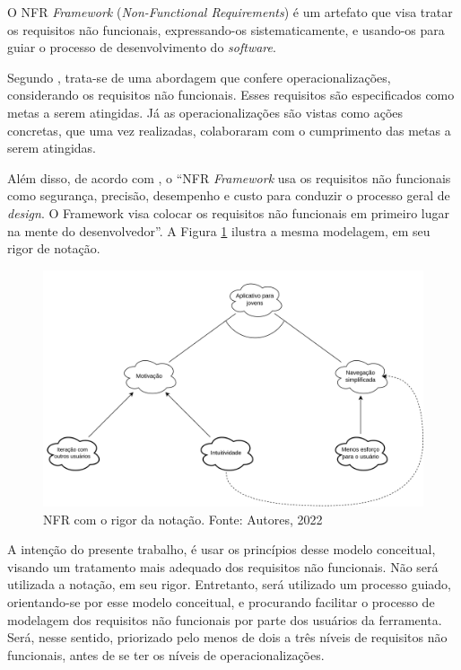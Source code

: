 \label{sec:nfr}

O NFR \textit{Framework} (\textit{Non-Functional Requirements}) é um artefato que visa tratar os requisitos não funcionais, expressando-os sistematicamente, e usando-os para guiar o processo de desenvolvimento do \textit{software}.

Segundo \cite{coutoproposta}, trata-se de uma abordagem que confere operacionalizações, considerando os requisitos não funcionais. Esses requisitos são especificados como metas a serem atingidas. Já as operacionalizações são vistas como ações concretas, que uma vez realizadas, colaboraram com o cumprimento das metas a serem atingidas.

Além disso, de acordo com \cite{chung2012non}, o “NFR \textit{Framework} usa os requisitos não funcionais como segurança, precisão, desempenho e custo para conduzir o processo geral de \textit{design}. O Framework visa colocar os requisitos não funcionais em primeiro lugar na mente do desenvolvedor”. A Figura \ref{fig:nfr_original} ilustra a mesma modelagem, em seu rigor de notação.

\begin{figure}[H]
    \begin{center}
        \includegraphics[scale=0.60]{figuras/Embasamento/nfr_rigor.png}
        \caption{{NFR com o rigor da notação. Fonte: Autores, 2022}}
        \label{fig:nfr_original}
    \end{center}
\end{figure}


A intenção do presente trabalho, é usar os princípios desse modelo conceitual, visando um tratamento mais adequado dos requisitos não funcionais. Não será utilizada a notação, em seu rigor. Entretanto, será utilizado um processo guiado, orientando-se por esse modelo conceitual, e procurando facilitar o processo de modelagem dos requisitos não funcionais por parte dos usuários da ferramenta. Será, nesse sentido, priorizado pelo menos de dois a três níveis de requisitos não funcionais, antes de se ter os níveis de operacionalizações.

